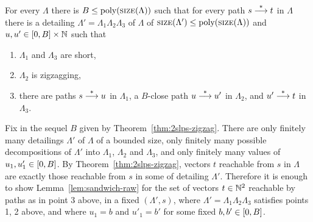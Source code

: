 \begin{appendixproof}
\begin{theorem}\label{thm:2slps-zigzag}
For every \dslps $\Lambda$ there is $B\leq \textup{poly}(\textsc{size}(\Lambda))$
such that for every path $s \stackrel{*}{\longrightarrow} t$ in $\Lambda$ 
there is a detailing $\Lambda' = \Lambda_1 \Lambda_2 \Lambda_3$ of $\Lambda$  
of $\textsc{size}(\Lambda')\leq \textup{poly}(\textsc{size}(\Lambda))$ and $u, u' \in [0, B] \times \mathbb{N}$ such that
\begin{enumerate}
  \item $\Lambda_1$ and $\Lambda_3$ are short, 
  \item $\Lambda_2$ is zigzagging,
  \item there are paths $s \stackrel{*}{\longrightarrow} u$ in $\Lambda_1$, 
  a $B$-close path $u \stackrel{*}{\longrightarrow} u'$ in $\Lambda_2$, and 
  $u'\stackrel{*}{\longrightarrow} t$ in $\Lambda_3$.
\end{enumerate}
\end{theorem}

Fix in the sequel $B$ given by Theorem~\ref{thm:2slps-zigzag}.
There are only finitely many detailings $\Lambda'$ of $\Lambda$ of a bounded size,
only finitely many possible decompositions of $\Lambda'$ into $\Lambda_1$, $\Lambda_2$ and $\Lambda_3$,
and only finitely many values of $u_1, u'_1\in[0, B]$.
By Theorem~\ref{thm:2slps-zigzag}, vectors $t$ reachable from $s$ in $\Lambda$ are exactly those
reachable from $s$ in some of detailing $\Lambda'$.
Therefore it is enough
to show Lemma~\ref{lem:sandwich-raw} for the set of vectors $t\in\mathbb{N}^2$ reachable by paths as in point 3 above,
in a fixed \slps $(\Lambda',s)$, where $\Lambda' = \Lambda_1 \Lambda_2 \Lambda_3$ satisfies points 1, 2 above,
and where $u_1 = b$ and $u'_1 = b'$ for some fixed $b,b'\in[0, B]$.


\end{appendixproof}
